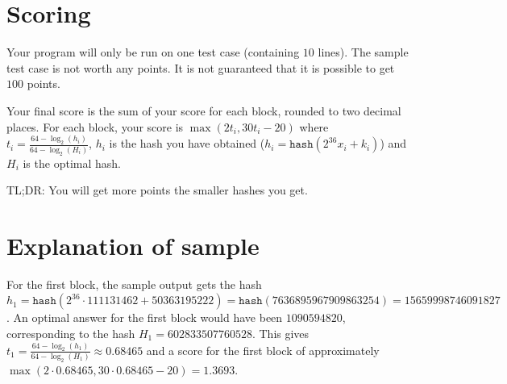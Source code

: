 \section*{Scoring}
Your program will only be run on one test case (containing $10$ lines). The
sample test case is not worth any points. It is not guaranteed that it is
possible to get $100$ points.

Your final score is the sum of your score for each block, rounded to two decimal
places. For each block, your score is $\max(2t_i, 30t_i-20)$ where $t_i =
\frac{64-\log_2(h_i)}{64-\log_2(H_i)}$, $h_i$ is the hash you have obtained
($h_i = \texttt{hash}(2^{36} x_i + k_i)$) and $H_i$ is the optimal hash.

TL;DR: You will get more points the smaller hashes you get.

\section*{Explanation of sample}
For the first block, the sample output gets the hash $h_1 = \texttt{hash}(2^{36}
\cdot 111131462 + 50363195222) = \texttt{hash}(7636895967909863254) =
15659998746091827$.  An optimal answer for the first block would have been
$1090594820$, corresponding to the hash $H_1 = 602833507760528$.  This gives
$t_1 = \frac{64-\log_2(h_1)}{64-\log_2(H_1)} \approx 0.68465$ and a score for
the first block of approximately $\max(2 \cdot 0.68465, 30 \cdot 0.68465-20) =
1.3693$.
